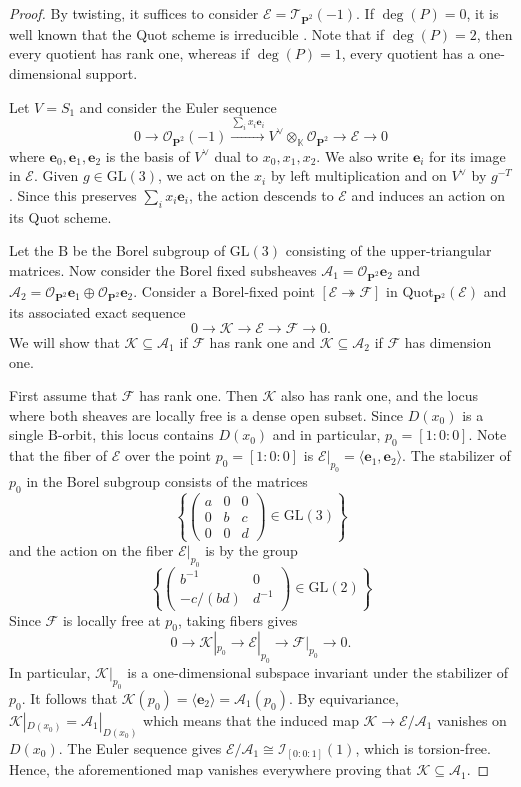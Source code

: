 \documentclass[leqno,11pt,a4paper]{amsart}
\theoremstyle{definition}
\numberwithin{equation}{section}
\newcommand{\kk}{\mathbb{K}}
\newcommand{\GL}{\mathrm{GL}}
\newcommand{\Quot}{\mathrm{Quot}}
\newcommand{\PP}{\mathbf{P}}
\newcommand{\bfe}{\mathbf{e}}
\newcommand{\EE}{\mathscr{E}}
\newcommand{\FF}{\mathscr{F}}
\newcommand{\OO}{\mathscr{O}}
\newcommand{\II}{\mathscr{I}}
\newcommand{\KK}{\mathscr{K}}
\begin{document}
\begin{proof}
By twisting, it suffices to consider $\EE=\mathscr{T}_{\PP^2}(-1)$. 
If $\deg(P) = 0$, it is well known that the Quot scheme is irreducible \cite[Theorem~1]{Ellingsrud_Lehn}.
Note that if $\deg(P) = 2$, then every quotient has rank one, whereas if $\deg(P) = 1$, every quotient has a one-dimensional support.

Let $V = S_1$ and consider the Euler sequence
$$
0\longrightarrow\OO_{\PP^2}(-1) \xrightarrow{\sum_i x_i\bfe_i} V^\vee\otimes_\kk\OO_{\PP^2}
\longrightarrow\EE\longrightarrow0
$$
where $\bfe_0,\bfe_1,\bfe_2$ is the basis of $V^\vee$ dual to $x_0,x_1,x_2$. 
We also write $\bfe_i$ for its image in $\EE$.
Given $g \in \GL(3)$, we act on the $x_i$ by left multiplication and on $V^\vee$ by $g^{-T}$. 
Since this preserves $\sum_i x_i\bfe_i$, the action descends to $\EE$ and induces an action on its Quot scheme.

Let the $\mathrm{B}$ be the Borel subgroup of $\GL(3)$ consisting of the upper-triangular matrices. 
Now consider the Borel fixed subsheaves $\mathscr A_1=\OO_{\PP^2}\bfe_2$ and $\mathscr{A}_2=\OO_{\PP^2}\bfe_1\oplus\OO_{\PP^2}\bfe_2$.
Consider a Borel-fixed point $[\EE \twoheadrightarrow \FF]$ in $\Quot_{\PP^2}(\EE)$ and its associated exact sequence
$$
0 \to \KK \to \EE \to \FF \to 0.
$$
We will show that  $\KK \subseteq \mathscr A_1$ if $\FF$ has rank one and $\KK \subseteq \mathscr A_2$ if $\FF$ has dimension one.

First assume that $\FF$ has rank one. Then $\KK$ also has rank one, and the locus where both sheaves are locally free is a dense open subset.
Since $D(x_0)$ is a single $\mathrm{B}$-orbit, this locus contains $D(x_0)$ and in particular, $p_0 = [1:0:0]$.
Note that the fiber of $\EE$ over the point $p_0=[1:0:0]$ is
$\EE|_{p_0}=\langle\bfe_1,\bfe_2\rangle$.
The stabilizer of $p_0$ in the Borel subgroup consists of the matrices
$$
\left\{
\begin{pmatrix}
a&0&0\\
0&b&c\\
0&0&d
\end{pmatrix} \in \GL(3)\right\}
$$
and the action on the fiber $\EE|_{p_0}$ is by the group
$$
\left\{
\begin{pmatrix}
b^{-1}&0\\
-c/(bd)&d^{-1}
\end{pmatrix}
\in \GL(2)
\right\}
$$
Since $\FF$ is locally free at $p_0$, taking fibers gives
$$
0\longrightarrow \KK|_{p_0} \longrightarrow\EE|_{p_0}
\longrightarrow \FF|_{p_0} \longrightarrow 0.
$$
In particular, $\KK|_{p_0}$ is a one-dimensional subspace invariant under the stabilizer of $p_0$.
It follows that  $\KK(p_0) = \langle\bfe_2\rangle = \mathscr A_1(p_0)$.
By equivariance, $\KK|_{D(x_0)}=\mathscr A_1|_{D(x_0)}$ which means that the induced map $\KK\to\EE/\mathscr A_1$ vanishes on $D(x_0)$.
The Euler sequence gives $\EE/\mathscr A_1\cong \II_{[0:0:1]}(1)$, which is torsion-free. 
Hence, the aforementioned map vanishes everywhere proving that $\KK\subseteq\mathscr A_1$.


\end{proof}
\end{document}
